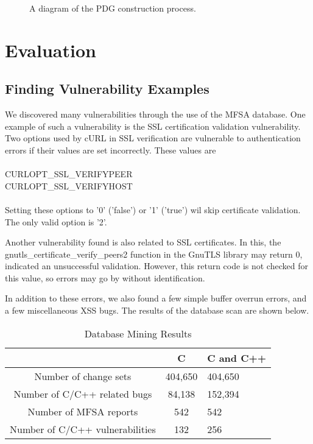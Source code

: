 \documentclass{acm_proc_article-sp}
\begin{document}
\begin{figure*}
\centering
{}
\caption{A diagram of the PDG construction process.}
\end{figure*}

\section{Evaluation}
\subsection{Finding Vulnerability Examples}
We discovered many vulnerabilities through the use of the MFSA database. One 
example of such a vulnerability is the SSL certification validation 
vulnerability. Two options used by cURL in SSL verification are vulnerable to 
authentication errors if their values are set incorrectly. These values are \\
\\
CURLOPT\_SSL\_VERIFYPEER \\ 
CURLOPT\_SSL\_VERIFYHOST \\
\\
Setting these options to '0' ('false') or '1' ('true') wil skip certificate 
validation. The only valid option is '2'.

Another vulnerability found is also related to SSL certificates. In this, the 
gnutls\_certificate\_verify\_peers2 function in the GnuTLS library may return 0, 
indicated an unsuccessful validation. However, this return code is not checked 
for this value, so errors may go by without identification.

In addition to these errors, we also found a few simple buffer overrun errors, 
and a few miscellaneous XSS bugs. The results of the database scan are shown 
below.

\begin{table}
\centering
\caption{Database Mining Results}
\begin{tabular}{|c|c|l|} \hline
& C & C and C++ \\ \hline
Number of change sets & 404,650 & 404,650 \\ \hline
Number of C/C++ related bugs & 84,138 & 152,394 \\ \hline
Number of MFSA reports & 542 & 542 \\ \hline
Number of C/C++ vulnerabilities & 132 & 256 \\ \hline
\end{tabular}

\end{table}
\end{document}

